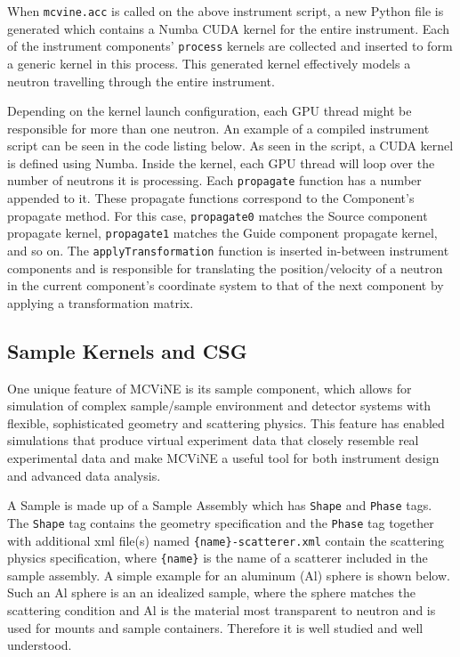 \vspace{1mm}

\vspace{1mm}

When \texttt{mcvine.acc} is called on the above instrument script, a new Python file is generated which contains a Numba CUDA kernel for the entire instrument. Each of the instrument components' \texttt{process} kernels are collected and inserted to form a generic kernel in this process. This generated kernel effectively models a neutron travelling through the entire instrument.

Depending on the kernel launch configuration, each GPU thread might be responsible for more than one neutron. An example of a compiled instrument script can be seen in the code listing below. As seen in the script, a CUDA kernel is defined using Numba. Inside the kernel, each GPU thread will loop over the number of neutrons it is processing. Each \texttt{propagate} function has a number appended to it. These propagate functions correspond to the Component's propagate method. For this case, \texttt{propagate0} matches the Source component propagate kernel, \texttt{propagate1} matches the Guide component propagate kernel, and so on. The \texttt{applyTransformation} function is inserted in-between instrument components and is responsible for translating the position/velocity of a neutron in the current component's coordinate system to that of the next component by applying a transformation matrix.

\vspace{1mm}

\vspace{1mm}

\subsection{Sample Kernels and CSG}

One unique feature of MCViNE is its sample component, which allows for simulation of complex sample/sample environment and detector systems with flexible, sophisticated geometry and scattering physics. 
This feature has enabled simulations that produce virtual experiment data that closely resemble real experimental data and make MCViNE a useful tool for both instrument design and advanced data analysis. 

A Sample is made up of a Sample Assembly which has \texttt{Shape} and \texttt{Phase} tags.
The \texttt{Shape} tag contains the geometry specification and the \texttt{Phase} tag together with additional xml file(s) named \texttt{\{name\}-scatterer.xml} contain the scattering physics specification, where \texttt{\{name\}} is the name of a scatterer included in the sample assembly.
A simple example for an aluminum (Al) sphere is shown below.
Such an Al sphere is an an idealized sample, where the sphere matches the scattering condition and Al is the material most transparent to neutron and is used for mounts and sample containers.  Therefore it is well studied and well understood. 

